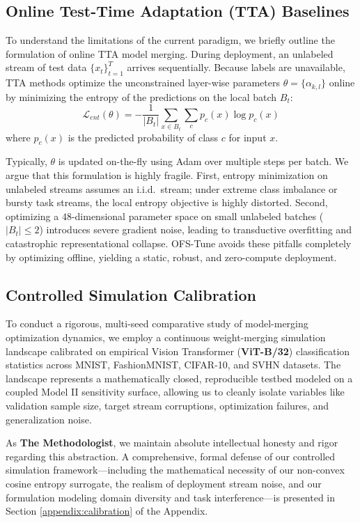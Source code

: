 \subsection{Online Test-Time Adaptation (TTA) Baselines}
To understand the limitations of the current paradigm, we briefly outline the formulation of online TTA model merging. During deployment, an unlabeled stream of test data $\{x_t\}_{t=1}^T$ arrives sequentially. Because labels are unavailable, TTA methods optimize the unconstrained layer-wise parameters $\theta = \{\alpha_{k, l}\}$ online by minimizing the entropy of the predictions on the local batch $B_t$:
\begin{equation}
\mathcal{L}_{ent}(\theta) = -\frac{1}{|B_t|} \sum_{x \in B_t} \sum_{c} p_c(x) \log p_c(x)
\end{equation}
where $p_c(x)$ is the predicted probability of class $c$ for input $x$.

Typically, $\theta$ is updated on-the-fly using Adam over multiple steps per batch. We argue that this formulation is highly fragile. First, entropy minimization on unlabeled streams assumes an i.i.d.\ stream; under extreme class imbalance or bursty task streams, the local entropy objective is highly distorted. Second, optimizing a $48$-dimensional parameter space on small unlabeled batches ($|B_t| \le 2$) introduces severe gradient noise, leading to transductive overfitting and catastrophic representational collapse. OFS-Tune avoids these pitfalls completely by optimizing offline, yielding a static, robust, and zero-compute deployment.

\subsection{Controlled Simulation Calibration}
To conduct a rigorous, multi-seed comparative study of model-merging optimization dynamics, we employ a continuous weight-merging simulation landscape calibrated on empirical Vision Transformer (\textbf{ViT-B/32}) classification statistics across MNIST, FashionMNIST, CIFAR-10, and SVHN datasets. The landscape represents a mathematically closed, reproducible testbed modeled on a coupled Model II sensitivity surface, allowing us to cleanly isolate variables like validation sample size, target stream corruptions, optimization failures, and generalization noise. 

As \textbf{The Methodologist}, we maintain absolute intellectual honesty and rigor regarding this abstraction. A comprehensive, formal defense of our controlled simulation framework---including the mathematical necessity of our non-convex cosine entropy surrogate, the realism of deployment stream noise, and our formulation modeling domain diversity and task interference---is presented in Section \ref{appendix:calibration} of the Appendix.
